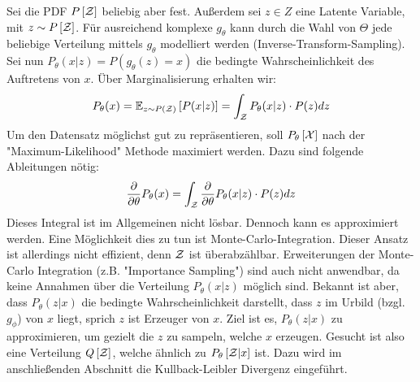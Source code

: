 Sei die PDF $P\left[ \mathcal{Z} \right]$ beliebig aber fest. Außerdem sei $z \in Z$ eine Latente Variable, mit $z \sim P\left[ \mathcal{Z}\right]$. Für ausreichend komplexe $g_\theta$ kann durch die Wahl von $\Theta$ jede beliebige Verteilung mittels $g_\theta$ modelliert werden (Inverse-Transform-Sampling). Sei nun $P_\theta(x \vert z) = P\left(g_\theta(z) = x \right)$ die bedingte Wahrscheinlichkeit des Auftretens von $x$. Über Marginalisierung erhalten wir:
\begin{equation}\label{eq:max_likelihood}
  P_\theta(x) = \mathbb{E}_{z \sim P(\mathcal{Z})} \left[ P(x \vert z) \right] = \int_{\mathcal{Z}} P_\theta(x \vert z) \cdot P(z) dz
\end{equation}
Um den Datensatz möglichst gut zu repräsentieren, soll $P_\theta\left[ \mathcal{X} \right]$ nach der "Maximum-Likelihood" Methode maximiert werden. Dazu sind folgende Ableitungen nötig:
\begin{equation}
  \frac{\partial}{\partial \theta} P_\theta(x) = \int_{\mathcal{Z}} \frac{\partial}{\partial \theta}P_\theta(x \vert z) \cdot P(z) dz
\end{equation}
Dieses Integral ist im Allgemeinen nicht lösbar. Dennoch kann es approximiert werden. Eine Möglichkeit dies zu tun ist Monte-Carlo-Integration. Dieser Ansatz ist allerdings nicht effizient, denn $\mathcal{Z}$ ist überabzählbar. Erweiterungen der Monte-Carlo Integration (z.B. "Importance Sampling") sind auch nicht anwendbar, da keine Annahmen über die Verteilung $P_\theta(x \vert z)$ möglich sind. Bekannt ist aber, dass $P_\theta(z \vert x)$ die bedingte Wahrscheinlichkeit darstellt, dass $z$ im Urbild (bzgl. $g_\phi$) von $x$ liegt, sprich $z$ ist Erzeuger von $x$. Ziel ist es, $P_\theta(z \vert x)$ zu approximieren, um gezielt die $z$ zu sampeln, welche $x$ erzeugen. Gesucht ist also eine Verteilung $Q\left[ \mathcal{Z} \right]$, welche ähnlich zu $P_\theta\left[ \mathcal{Z} \vert x\right]$ ist. Dazu wird im anschließenden Abschnitt die Kullback-Leibler Divergenz eingeführt.


